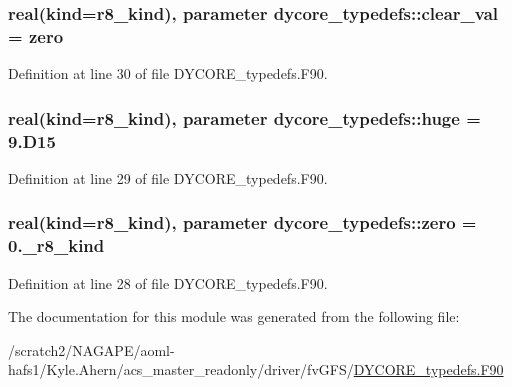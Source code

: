 \subsubsection[{clear\-\_\-val}]{\setlength{\rightskip}{0pt plus 5cm}real(kind=r8\-\_\-kind), parameter dycore\-\_\-typedefs\-::clear\-\_\-val = {\bf zero}}\label{classdycore__typedefs_adfd79c198bdf05be48cf1bf5bc32f7ed}


Definition at line 30 of file D\-Y\-C\-O\-R\-E\-\_\-typedefs.\-F90.

\subsubsection[{huge}]{\setlength{\rightskip}{0pt plus 5cm}real(kind=r8\-\_\-kind), parameter dycore\-\_\-typedefs\-::huge = 9.\-D15}\label{classdycore__typedefs_a6c66ffd3c70a9d6caafafb6e1d6419b9}


Definition at line 29 of file D\-Y\-C\-O\-R\-E\-\_\-typedefs.\-F90.

\subsubsection[{zero}]{\setlength{\rightskip}{0pt plus 5cm}real(kind=r8\-\_\-kind), parameter dycore\-\_\-typedefs\-::zero = 0.\-\_\-r8\-\_\-kind}\label{classdycore__typedefs_ae3151b57d26d5e0876cec34bea3cc2a1}


Definition at line 28 of file D\-Y\-C\-O\-R\-E\-\_\-typedefs.\-F90.



The documentation for this module was generated from the following file\-:\begin{DoxyCompactItemize}
\item 
/scratch2/\-N\-A\-G\-A\-P\-E/aoml-\/hafs1/\-Kyle.\-Ahern/acs\-\_\-master\-\_\-readonly/driver/fv\-G\-F\-S/\hyperlink{DYCORE__typedefs_8F90}{D\-Y\-C\-O\-R\-E\-\_\-typedefs.\-F90}\end{DoxyCompactItemize}
